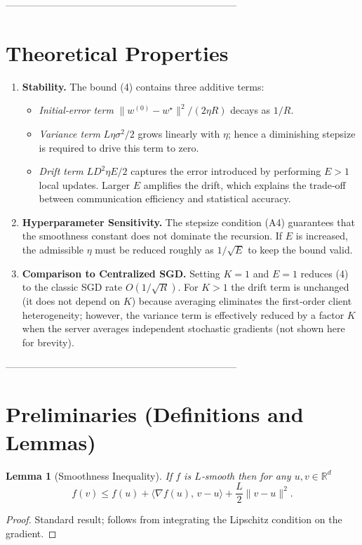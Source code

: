 \documentclass{article}
\newtheorem{lemma}{Lemma}
\newcommand{\R}{\mathbb{R}}
\begin{document}
-----------------------------------------------------------------------

\section*{Theoretical Properties}
\begin{enumerate}[label=\arabic*.]
\item \textbf{Stability.}  
The bound (4) contains three additive terms:
\begin{itemize}
\item \emph{Initial‑error term} $\|w^{(0)}-w^\star\|^{2}/(2\eta R)$ decays as $1/R$.
\item \emph{Variance term} $L\eta\sigma^{2}/2$ grows linearly with $\eta$;
hence a diminishing stepsize is required to drive this term to zero.
\item \emph{Drift term} $L D^{2}\eta E/2$ captures the error introduced by
performing $E>1$ local updates. Larger $E$ amplifies the drift, which
explains the trade‑off between communication efficiency and statistical
accuracy.
\end{itemize}

\item \textbf{Hyperparameter Sensitivity.}  
The stepsize condition (A4) guarantees that the smoothness constant
does not dominate the recursion. If $E$ is increased, the admissible
$\eta$ must be reduced roughly as $1/\sqrt{E}$ to keep the bound valid.

\item \textbf{Comparison to Centralized SGD.}  
Setting $K=1$ and $E=1$ reduces (4) to the classic SGD rate
$O(1/\sqrt{R})$. For $K>1$ the drift term is unchanged (it does not depend on $K$)
because averaging eliminates the first‑order client heterogeneity; however,
the variance term is effectively reduced by a factor $K$ when the server
averages independent stochastic gradients (not shown here for brevity).

\end{enumerate}

-----------------------------------------------------------------------

\section*{Preliminaries (Definitions and Lemmas)}
\begin{lemma}[Smoothness Inequality]\label{lem:smooth}
If $f$ is $L$‑smooth then for any $u,v\in\R^{d}$
\[
f(v) \le f(u) + \langle\nabla f(u),\,v-u\rangle + \frac{L}{2}\|v-u\|^{2}.
\tag{L1}
\]
\end{lemma}
\begin{proof}
Standard result; follows from integrating the Lipschitz condition on the
gradient. \qedhere
\end{proof}
\end{document}
